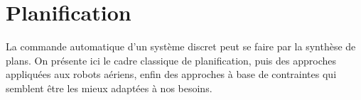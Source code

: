 %
%
%
%
%


%
\pagebreak
\section{Planification}
La commande automatique d'un système discret peut se faire par la synthèse de plans. On présente ici le cadre classique de planification, puis des approches appliquées aux robots aériens, enfin des approches à base de contraintes qui semblent être les mieux adaptées à nos besoins.

